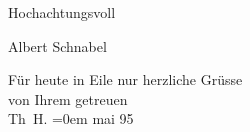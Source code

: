 \pstart
           \centering{}Hochachtungsvoll\pend
           
\pstart
           \raggedleft{}Albert Schnabel\pend
           
\pstart
           Für heute in Eile nur herzliche Grüsse{\\[\baselineskip]} von Ihrem getreuen{\\[\baselineskip]}\spacefill\mbox{Th H.}\pend
           \leftskip=0em{}
 mai 95\pend
           \endnumbering{}
\begin{anhang}
\end{anhang}\newcommand{\dateiname}{L03862}\newcommand{\titel}{Theodor Herzl an Arthur Schnitzler, 19. 5. 1895}\newcommand{\editorInnen}{Selma Jahnke und Martin Anton Müller}
